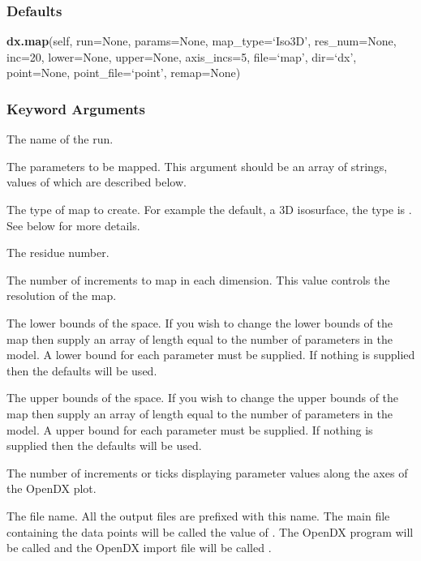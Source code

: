   
 \subsubsection{Defaults} 

 \textsf{\textbf{dx.map}(self, run=None, params=None, map\_type=`Iso3D', res\_num=None, inc=20, lower=None, upper=None, axis\_incs=5, file=`map', dir=`dx', point=None, point\_file=`point', remap=None)} 

  
 \subsubsection{Keyword Arguments} 

   The name of the run.   

   The parameters to be mapped.  This argument should be an array of strings, values of which are described below.   

   The type of map to create.  For example the default, a 3D isosurface, the type is .  See below for more details.   

   The residue number.   

   The number of increments to map in each dimension.  This value controls the resolution of the map.   

   The lower bounds of the space.  If you wish to change the lower bounds of the map then supply an array of length equal to the number of parameters in the model.  A lower bound for each parameter must be supplied.  If nothing is supplied then the defaults will be used.   

   The upper bounds of the space.  If you wish to change the upper bounds of the map then supply an array of length equal to the number of parameters in the model.  A upper bound for each parameter must be supplied.  If nothing is supplied then the defaults will be used.   

   The number of increments or ticks displaying parameter values along the axes of the OpenDX plot.   

   The file name.  All the output files are prefixed with this name.  The main file containing the data points will be called the value of .  The OpenDX program will be called  and the OpenDX import file will be called .   

